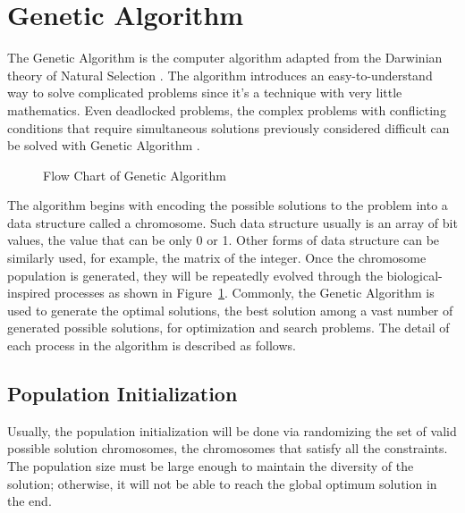\documentclass[12pt,oneside,openright,a4paper]{cpe-english-project}
\begin{document}
\section{Genetic Algorithm}
The Genetic Algorithm is the computer algorithm adapted from the Darwinian theory of Natural Selection \cite{immanuel2019genetic}. The algorithm introduces an easy-to-understand way to solve complicated problems since it's a technique with very little mathematics. Even deadlocked problems, the complex problems with conflicting conditions that require simultaneous solutions previously considered difficult can be solved with Genetic Algorithm \cite{man1996genetic}.

\begin{figure}[!h]\centering
{}
\caption{Flow Chart of Genetic Algorithm}
\label{fig:theory-GA-flowchart}
\end{figure}

The algorithm begins with encoding the possible solutions to the problem into a data structure called a chromosome. Such data structure usually is an array of bit values, the value that can be only 0 or 1. Other forms of data structure can be similarly used, for example, the matrix of the integer. Once the chromosome population is generated, they will be repeatedly evolved through the biological-inspired processes as shown in Figure~\ref{fig:theory-GA-flowchart}. Commonly, the Genetic Algorithm is used to generate the optimal solutions, the best solution among a vast number of generated possible solutions, for optimization and search problems. The detail of each process in the algorithm is described as follows.

\subsection{Population Initialization}
Usually, the population initialization will be done via randomizing the set of valid possible solution chromosomes, the chromosomes that satisfy all the constraints. The population size must be large enough to maintain the diversity of the solution; otherwise, it will not be able to reach the global optimum solution in the end.
\end{document}
